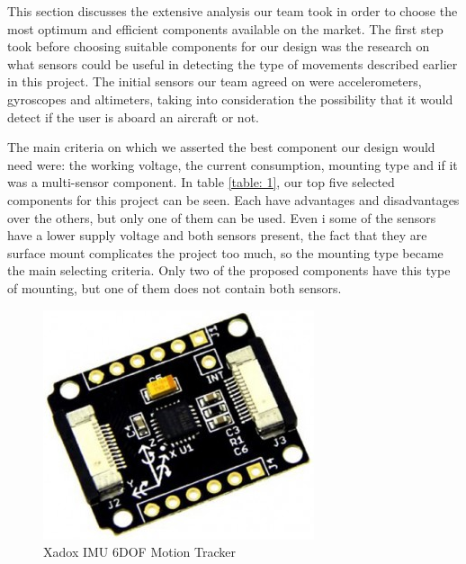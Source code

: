 This section discusses the extensive analysis our team took in order to choose the most optimum and efficient components available on the market. The first step took before choosing suitable components for our design was the research on what sensors could be useful in detecting the type of movements described earlier in this project. The initial sensors our team agreed on were accelerometers, gyroscopes and altimeters, taking into consideration the possibility that it would detect if the user is aboard an aircraft or not.

The main criteria on which we asserted the best component our design would need were: the working voltage, the current consumption, mounting type and if it was a multi-sensor component. In table \ref{table: 1}, our top five selected components for this project can be seen. Each have advantages and disadvantages over the others, but only one of them can be used. Even i some of the sensors have a lower supply voltage and both sensors present, the fact that they are surface mount complicates the project too much, so the mounting type became the main selecting criteria. Only two of the proposed components have this type of mounting, but one of them does not contain both sensors.
\begin{figure}
\centering
\includegraphics[scale=0.4]{figures/Xadow_IMU_6DOF.PNG}
\caption{Xadox IMU 6DOF Motion Tracker \label{fig:xadox}}
\end{figure}

